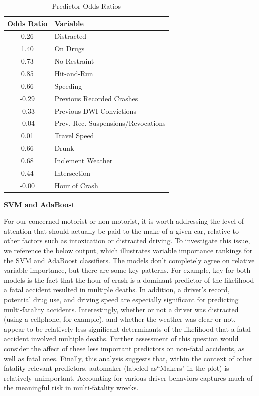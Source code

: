 \documentclass[11pt, oneside,titlepage]{article}   	%
\begin{document}
\begin{table}[H]
\centering
\begin{tabular}{cl}
  \hline
 Odds Ratio & Variable \\ 
  \hline
  0.26 & Distracted \\ 
  1.40 & On Drugs \\ 
  0.73 & No Restraint \\ 
  0.85 & Hit-and-Run \\ 
  0.66 & Speeding \\ 
  -0.29 & Previous Recorded Crashes \\ 
  -0.33 & Previous DWI Convictions \\ 
  -0.04 & Prev. Rec. Suspensions/Revocations \\ 
   0.01 & Travel Speed \\ 
   0.66 & Drunk \\ 
   0.68 & Inclement Weather \\ 
   0.44 & Intersection \\ 
   -0.00 & Hour of Crash \\ 
   \hline
\end{tabular}
\caption{Predictor Odds Ratios} 
\end{table}

\textbf{SVM and AdaBoost}

For our concerned motorist or non-motorist, it is worth addressing the level of attention that should actually be paid to the make of a given car, relative to other factors such as intoxication or distracted driving. To investigate this issue, we reference the below output, which illustrates variable importance rankings for the SVM and AdaBoost classifiers. The models don't completely agree on relative variable importance, but there are some key patterns. For example, key for both models is the fact that the hour of crash is a dominant predictor of the likelihood a fatal accident resulted in multiple deaths. In addition, a driver's record, potential drug use, and driving speed are especially significant for predicting multi-fatality accidents. Interestingly, whether or not a driver was distracted (using a cellphone, for example), and whether the weather was clear or not, appear to be relatively less significant determinants of the likelihood that a fatal accident involved multiple deaths. Further assessment of this question would consider the affect of these less important predictors on non-fatal accidents, as well as fatal ones. Finally, this analysis suggests that, within the context of other fatality-relevant predictors, automaker (labeled as``Makers" in the plot) is relatively unimportant. Accounting for various driver behaviors captures much of the meaningful risk in multi-fatality wrecks. \\
\end{document}
